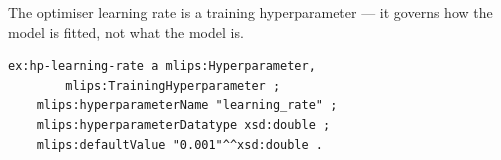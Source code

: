 The optimiser learning rate is a training hyperparameter — it
governs how the model is fitted, not what the model is.
\begin{lstlisting}[language=turtle]
ex:hp-learning-rate a mlips:Hyperparameter,
        mlips:TrainingHyperparameter ;
    mlips:hyperparameterName "learning_rate" ;
    mlips:hyperparameterDatatype xsd:double ;
    mlips:defaultValue "0.001"^^xsd:double .
\end{lstlisting}
